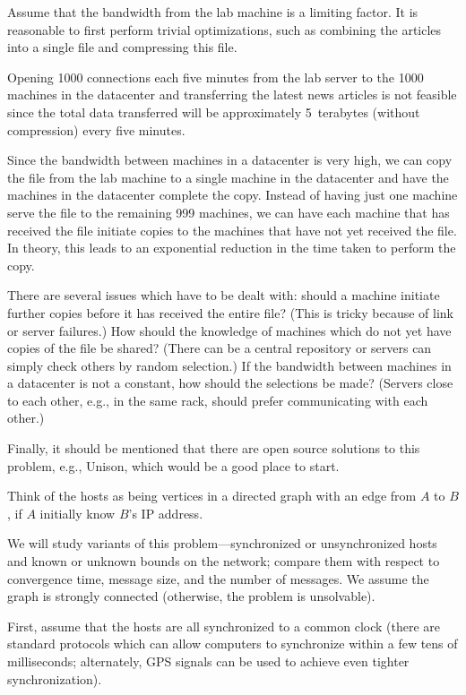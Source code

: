 Assume that the bandwidth from the lab machine is a limiting factor.
It is reasonable to first perform trivial optimizations, such as
combining the articles into a single file and compressing this file.

Opening 1000 connections each five minutes from the lab server to 
the 1000 machines in the datacenter and transferring the
latest news articles is not feasible since the total data transferred
will be approximately 5~terabytes (without compression) every five minutes. 

Since the bandwidth between machines in a datacenter is very high,
we can copy the file from the lab machine to a single machine
in the datacenter and have the machines in the datacenter 
complete the copy.  Instead of having just one machine serve
the file to the remaining 999 machines, we can have each machine 
that has received the file initiate copies to the machines that
have not yet received the file.  In theory, this leads to an exponential
reduction in the time taken to perform the copy.

There are several issues which have to be dealt with: should a machine initiate
further copies before it has received the entire file? (This is tricky
because of link or server failures.) How should the knowledge of machines
which do not yet have copies of the file be shared? (There can be a
central repository or servers can simply check others by random
selection.)  If the bandwidth between machines in a datacenter is not a
constant, how should the selections be made? (Servers close to each other, e.g., in the
same rack, should prefer communicating with each other.)  

Finally, it should be mentioned that there are open source 
solutions to this problem, e.g., Unison, which would be a good place to start.

Think of the hosts as being vertices in a directed graph with an
edge from $A$ to $B$, if $A$ initially know $B$'s IP address.

We will study variants of this problem---synchronized or unsynchronized
hosts and known or unknown bounds on the network; compare
them with respect to convergence time, message size, and the number
of messages. We assume the graph is strongly connected (otherwise, the problem is unsolvable).

First, assume that the hosts are all synchronized to a common
clock (there are standard protocols which can allow computers
to synchronize within a few tens of milliseconds; alternately,
GPS signals can be used to achieve even tighter synchronization).

